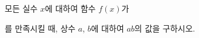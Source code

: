 \hspace*{2mm}\begin{minipage}[t]{\dimexpr\linewidth-2mm\relax}\vspace{0pt}
모든 실수 $x$에 대하여 함수 $f(x)$가 \par\smallskip{}\par\smallskip\noindent 를 만족시킬 때, 상수 $a$, $b$에 대하여 $ab$의 값을 구하시오.\end{minipage}
